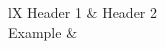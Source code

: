 \begin{RpgTable}[breakable,width=0.75\linewidth]{lX}
    Header 1 & Header 2
    \\
    Example & \Blindtext
\end{RpgTable}
